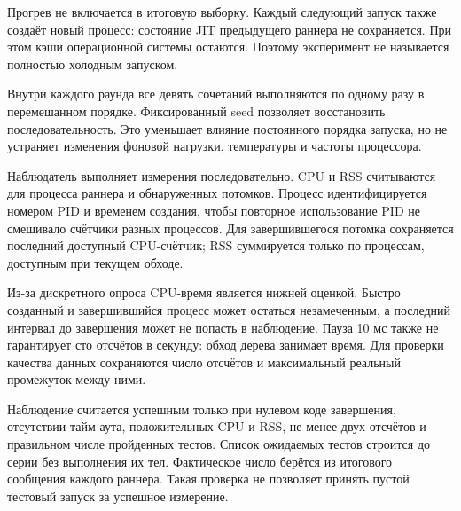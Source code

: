 Прогрев не включается в итоговую выборку. Каждый следующий запуск также создаёт новый процесс: состояние JIT предыдущего раннера не сохраняется. При этом кэши операционной системы остаются. Поэтому эксперимент не называется полностью холодным запуском.

Внутри каждого раунда все девять сочетаний выполняются по одному разу в перемешанном порядке. Фиксированный seed позволяет восстановить последовательность. Это уменьшает влияние постоянного порядка запуска, но не устраняет изменения фоновой нагрузки, температуры и частоты процессора.

Наблюдатель выполняет измерения последовательно. CPU и RSS считываются для процесса раннера и обнаруженных потомков. Процесс идентифицируется номером PID и временем создания, чтобы повторное использование PID не смешивало счётчики разных процессов. Для завершившегося потомка сохраняется последний доступный CPU-счётчик; RSS суммируется только по процессам, доступным при текущем обходе.

Из-за дискретного опроса CPU-время является нижней оценкой. Быстро созданный и завершившийся процесс может остаться незамеченным, а последний интервал до завершения может не попасть в наблюдение. Пауза 10 мс также не гарантирует сто отсчётов в секунду: обход дерева занимает время. Для проверки качества данных сохраняются число отсчётов и максимальный реальный промежуток между ними.

Наблюдение считается успешным только при нулевом коде завершения, отсутствии тайм-аута, положительных CPU и RSS, не менее двух отсчётов и правильном числе пройденных тестов. Список ожидаемых тестов строится до серии без выполнения их тел. Фактическое число берётся из итогового сообщения каждого раннера. Такая проверка не позволяет принять пустой тестовый запуск за успешное измерение.
